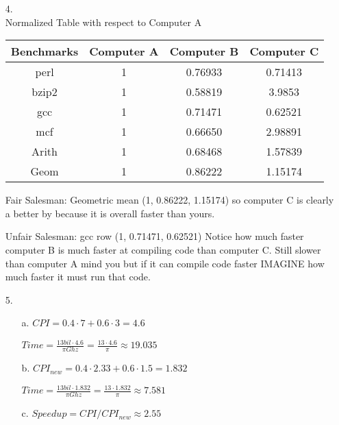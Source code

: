 \documentclass{article}
\begin{document}
\begin{itemize}
  \item[4.] \hfill\\
    Normalized Table with respect to Computer A\\
    \begin{tabular}{| c | c | c | c |}
      \hline
      Benchmarks & Computer A & Computer B & Computer C\\
      \hline
      perl & 1 & 0.76933 & 0.71413\\
      \hline
      bzip2 & 1 & 0.58819 & 3.9853\\
      \hline
      gcc & 1 & 0.71471 & 0.62521\\
      \hline
      mcf & 1 & 0.66650 & 2.98891\\
      \hline
      \hline
      Arith & 1 & 0.68468 & 1.57839\\
      \hline
      Geom & 1 & 0.86222 & 1.15174\\
      \hline
    \end{tabular}

    Fair Salesman: Geometric mean (1, 0.86222, 1.15174) so computer C is clearly a better by because it is overall faster than yours.

    Unfair Salesman: gcc row (1, 0.71471, 0.62521) Notice how much faster computer B is much faster at compiling code than computer C. Still slower than computer A mind you but if it can compile code faster IMAGINE how much faster it must run that code.

  \item[5.]
    \begin{itemize}
      \item[a.]
        $CPI = 0.4 \cdot 7 + 0.6 \cdot 3 = 4.6$
        
        $Time = \frac{13bil \cdot 4.6}{\pi Ghz} = \frac{13 \cdot 4.6}{\pi} \approx 19.035$
      \item[b.]
        $CPI_{new} = 0.4 \cdot 2.33 + 0.6 \cdot 1.5 = 1.832$

        $Time = \frac{13bil \cdot 1.832}{\pi Ghz} = \frac{13 \cdot 1.832}{\pi} \approx 7.581$

       \item[c.]
         $Speedup = CPI/CPI_{new} \approx 2.55$
    
    \end{itemize}
\end{itemize}
\end{document}
